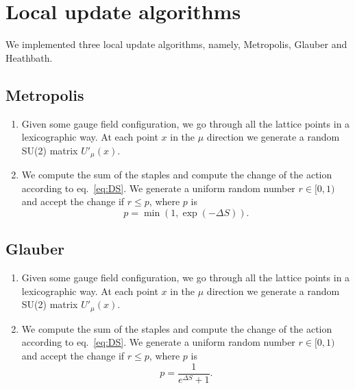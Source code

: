 \documentclass[12pt,a4paper]{article}
\begin{document}
\section{Local update algorithms}

We implemented three local update algorithms, namely, Metropolis, Glauber and Heathbath.

\subsection{Metropolis}
\begin{enumerate}
	\item Given some gauge field configuration, we go through all the lattice points in a lexicographic way. At each point $x$ in the $\mu$ direction we generate a random SU(2) matrix $U'_{\mu}(x)$.
	
	\item We compute the sum of the staples and compute the change of the action according to eq.\ \eqref{eq:DS}. We generate a uniform random number $r\in [0,1)$ and accept the change if $r \leq p$, where $p$ is
	\begin{equation}
		p = \min (1, \exp(-\Delta S)).
\end{equation}	 
\end{enumerate}

\subsection{Glauber}
\begin{enumerate}
	\item Given some gauge field configuration, we go through all the lattice points in a lexicographic way. At each point $x$ in the $\mu$ direction we generate a random SU(2) matrix $U'_{\mu}(x)$.
	
	\item We compute the sum of the staples and compute the change of the action according to eq.\ \eqref{eq:DS}. We generate a uniform random number $r\in [0,1)$ and accept the change if $r \leq p$, where $p$ is
	\begin{equation}
		p = \frac{1}{e^{\Delta S} + 1}.
\end{equation}	 
\end{enumerate}
\end{document}
